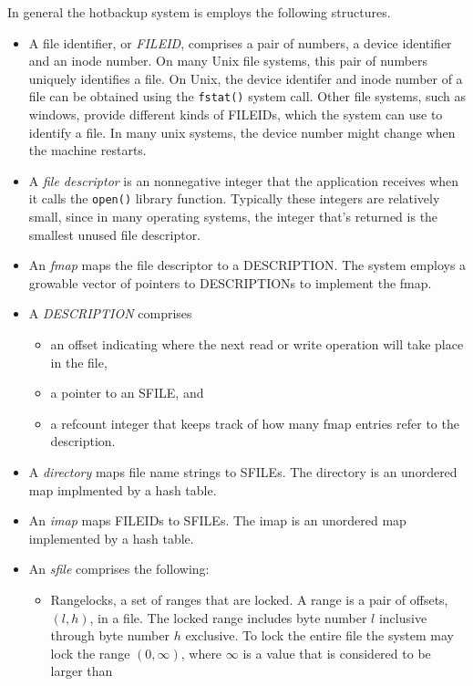 \documentclass[10pt]{article}
\begin{document}
In general the hotbackup system is employs the following structures.
\begin{itemize}
\item A file identifier, or \textit{FILEID}, comprises a pair of
  numbers, a device identifier and an inode number.  On many Unix file
  systems, this pair of numbers uniquely identifies a file.  On Unix,
  the device identifer and inode number of a file can be obtained
  using the \texttt{fstat()} system call.  Other file systems, such as
  windows, provide different kinds of FILEIDs, which the system can
  use to identify a file.  In many unix systems, the device number
  might change when the machine restarts.
\item A \textit{file descriptor} is an nonnegative integer that the
  application receives when it calls the \texttt{open()} library
  function.  Typically these integers are relatively small, since in
  many operating systems, the integer that's returned is the smallest
  unused file descriptor.
\item An \textit{fmap} maps the file descriptor to a DESCRIPTION.  The
  system employs a growable vector of pointers to DESCRIPTIONs to implement the fmap.
\item A \textit{DESCRIPTION} comprises
 \begin{itemize}
  \item an offset indicating where the next read or write operation will take place in the file,
  \item a pointer to an SFILE, and
  \item a refcount integer that keeps track of how many fmap entries refer to the description.
 \end{itemize}
\item A \textit{directory} maps file name strings to SFILEs.  The
  directory is an unordered map implmented by a hash table.
\item An \textit{imap} maps FILEIDs to SFILEs.  The imap is an unordered map implemented by a hash table.
\item An \textit{sfile} comprises the following:
 \begin{itemize}
   \item Rangelocks, a set of ranges that are locked.  A range is a
     pair of offsets, $(l,h)$, in a file.  The locked range includes
     byte number $l$ inclusive through byte number $h$ exclusive.  To
     lock the entire file the system may lock the range $(0, \infty)$,
     where $\infty$ is a value that is considered to be larger than

\end{itemize}
\end{itemize}
\end{document}
